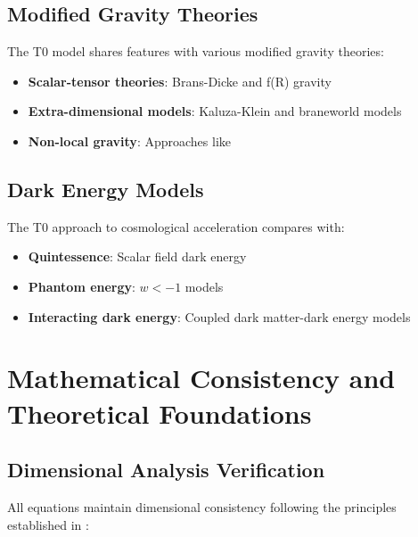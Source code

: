 \documentclass[12pt,a4paper]{article}
\begin{document}
	\subsection{Modified Gravity Theories}
	\label{subsec:modified_gravity}
	
	The T0 model shares features with various modified gravity theories:
	
	\begin{itemize}
		\item \textbf{Scalar-tensor theories}: Brans-Dicke \citep{brans1961} and f(R) gravity \citep{sotiriou2010}
		\item \textbf{Extra-dimensional models}: Kaluza-Klein \citep{kaluza1921,klein1926} and braneworld models \citep{randall1999}
		\item \textbf{Non-local gravity}: Approaches like \citep{woodard2007,koivisto2008}
	\end{itemize}
	
	\subsection{Dark Energy Models}
	\label{subsec:dark_energy_models}
	
	The T0 approach to cosmological acceleration compares with:
	\begin{itemize}
		\item \textbf{Quintessence}: Scalar field dark energy \citep{caldwell1998,steinhardt1999}
		\item \textbf{Phantom energy}: $w < -1$ models \citep{caldwell2003}
		\item \textbf{Interacting dark energy}: Coupled dark matter-dark energy models \citep{amendola2000}
	\end{itemize}
	
	\section{Mathematical Consistency and Theoretical Foundations}
	\label{sec:mathematical_consistency}
	
	\subsection{Dimensional Analysis Verification}
	\label{subsec:dimensional_verification}
	
	All equations maintain dimensional consistency following the principles established in \citep{barenblatt1996,bridgman1922}:
	
\end{document}
